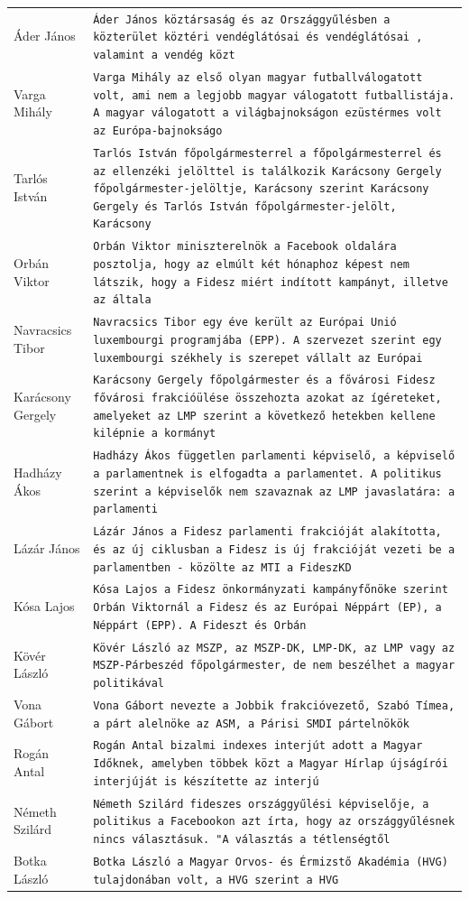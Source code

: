 \documentclass[journal]{IEEEtai}
\begin{document}
\def\myrowb#1#2{#1 & {\tt #2} \\}
\begin{table}
\centering
\begin{tabular}{lp{14cm}}
\myrowb{Áder János}
{Áder János köztársaság és az Országgyűlésben  a közterület köztéri vendéglátósai és vendéglátósai , valamint a vendég közt}
\myrowb{Varga Mihály}
{Varga Mihály az első olyan magyar futballválogatott volt, ami nem a legjobb magyar válogatott futballistája. A magyar válogatott a világbajnokságon ezüstérmes volt az Európa-bajnokságo}
\myrowb{Tarlós István}
{Tarlós István főpolgármesterrel a főpolgármesterrel és az ellenzéki jelölttel is találkozik Karácsony Gergely főpolgármester-jelöltje, Karácsony szerint Karácsony Gergely és Tarlós István főpolgármester-jelölt, Karácsony }
\myrowb{Orbán Viktor}
{Orbán Viktor miniszterelnök a Facebook oldalára  posztolja, hogy az elmúlt két hónaphoz képest nem látszik, hogy a Fidesz miért indított kampányt, illetve az általa }
\myrowb{Navracsics Tibor}
{Navracsics Tibor egy éve került az Európai Unió luxembourgi programjába (EPP). A szervezet szerint egy luxembourgi székhely is szerepet vállalt az Európai }
\myrowb{Karácsony Gergely}
{Karácsony Gergely főpolgármester és a fővárosi Fidesz fővárosi frakcióülése összehozta azokat az ígéreteket, amelyeket az LMP szerint a következő hetekben kellene kilépnie a kormányt }
\myrowb{Hadházy Ákos}
{Hadházy Ákos független parlamenti képviselő, a képviselő a parlamentnek is elfogadta a parlamentet. A politikus szerint a képviselők nem szavaznak az LMP javaslatára: a parlamenti }
\myrowb{Lázár János}
{Lázár János a Fidesz parlamenti frakcióját alakította, és az új ciklusban a Fidesz is új frakcióját vezeti be a parlamentben - közölte az MTI a FideszKD}
\myrowb{Kósa Lajos}
{Kósa Lajos a Fidesz önkormányzati kampányfőnöke szerint Orbán Viktornál a Fidesz és az Európai Néppárt (EP), a Néppárt (EPP). A Fideszt és Orbán }
\myrowb{Kövér László}
{Kövér László az MSZP, az MSZP-DK, LMP-DK, az LMP vagy az MSZP-Párbeszéd főpolgármester, de nem beszélhet a magyar politikával }
\myrowb{Vona Gábort}
{Vona Gábort nevezte a Jobbik frakcióvezető, Szabó Tímea, a párt alelnöke az ASM, a Párisi SMDI pártelnökök }
\myrowb{Rogán Antal}
{Rogán Antal bizalmi indexes interjút adott a Magyar Időknek, amelyben többek közt a Magyar Hírlap újságírói interjúját is készítette az interjú }
\myrowb{Németh Szilárd}
{Németh Szilárd fideszes országgyűlési képviselője, a politikus a Facebookon azt írta, hogy az országgyűlésnek nincs választásuk. "A választás a tétlenségtől }
\myrowb{Botka László}
{Botka László a Magyar Orvos- és Érmizstő Akadémia (HVG) tulajdonában volt, a HVG szerint a HVG }

\end{tabular}
\end{table}
\end{document}
